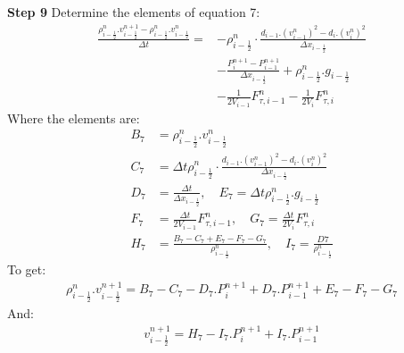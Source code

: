 \documentclass[11pt,letterpaper,titlepage]{article}
\newcommand{\half}{\frac{1}{2}}
\begin{document}
\newpage \noindent
\textbf{Step 9}\newline
Determine the elements of equation 7:
\begin{equation*}
\begin{aligned}
\frac{\rho_{i-\half}^{n}.v_{i-\half}^{n+1}-\rho_{i-\half}^n.v_{i-\half}^n}{\Delta t} =&- \rho_{i-\half}^n\cdot\frac{d_{i-1}.(v_{i-1}^n)^2-d_{i}.(v_{i}^n)^2}{\Delta x_{i-\half}}     \\
&-\frac{P_{i}^{n+1}-P_{i-1}^{n+1}}{\Delta x_{i-\half}} +\rho_{i-\half}^n.g_{i-\half} \\
&-\frac{1}{2V_{i-1}}F_{\tau,{i-1}}^n- \frac{1}{2V_{i}}F_{\tau,i}^n
\end{aligned}
\end{equation*}
\newline
Where the elements are:
\begin{equation*}
\begin{aligned}
B_7&=\rho_{i-\half}^n.v_{i-\half}^n\\
C_7&=\Delta t\rho_{i-\half}^n\cdot\frac{d_{i-1}.(v_{i-1}^n)^2-d_{i}.(v_{i}^n)^2}{\Delta x_{i-\half}}\\
D_7&=\frac{\Delta t}{\Delta x_{i-\half}}, \quad E_7=\Delta t \rho_{i-\half}^n.g_{i-\half} \\
F_7&=\frac{\Delta t}{2V_{i-1}}F_{\tau,{i-1}}^n, \quad G_7=\frac{\Delta t}{2V_{i}}F_{\tau,i}^n \\
H_7&=\frac{B_7-C_7+E_7-F_7-G_7}{\rho_{i-\half}^{n}}, \quad I_7=\frac{D7}{\rho_{i-\half}^{n}}
\end{aligned}
\end{equation*}
\newline
To get:
\begin{equation*}
\begin{aligned}
\rho_{i-\half}^{n}.v_{i-\half}^{n+1}=B_7-C_7-D_7.P_{i}^{n+1}+D_7.P_{i-1}^{n+1}+E_7-F_7-G_7
\end{aligned}
\end{equation*}
And:
\begin{equation}
\begin{aligned}
v_{i-\half}^{n+1}=H_7-I_7.P_{i}^{n+1}+I_7.P_{i-1}^{n+1}
\end{aligned}
\end{equation}
\end{document}
